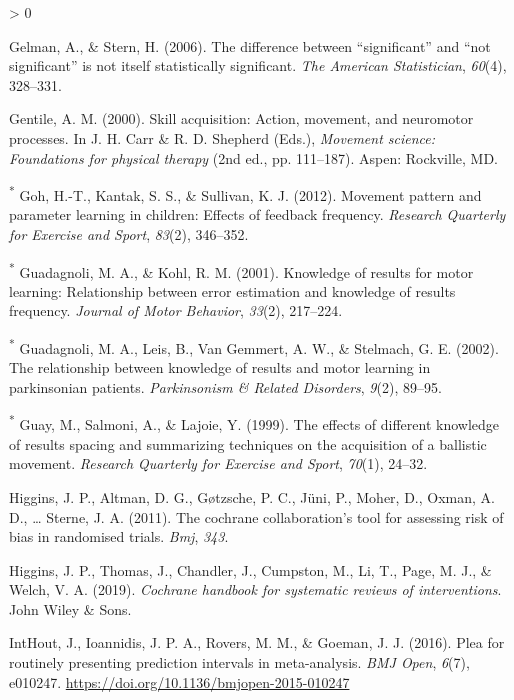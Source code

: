 \documentclass[
  english,
  man, donotrepeattitle,floatsintext]{apa7}
\newlength{\cslhangindent}
\newenvironment{CSLReferences}[2] %
 {%
  \setlength{\parindent}{0pt}
  \ifodd #1 \everypar{\setlength{\hangindent}{\cslhangindent}}\ignorespaces\fi
  \ifnum #2 > 0
  \setlength{\parskip}{#2\baselineskip}
  \fi
 }%
 {}
\begin{document}
\begin{CSLReferences}{1}{0}
\leavevmode\hypertarget{ref-Gelman2006}{}%
Gelman, A., \& Stern, H. (2006). The difference between {``significant''} and {``not significant''} is not itself statistically significant. \emph{The American Statistician}, \emph{60}(4), 328--331.

\leavevmode\hypertarget{ref-Gentile2000}{}%
Gentile, A. M. (2000). Skill acquisition: Action, movement, and neuromotor processes. In J. H. Carr \& R. D. Shepherd (Eds.), \emph{Movement science: Foundations for physical therapy} (2nd ed., pp. 111--187). Aspen: Rockville, MD.

\leavevmode\hypertarget{ref-Goh2012}{}%
\textsuperscript{*} Goh, H.-T., Kantak, S. S., \& Sullivan, K. J. (2012). Movement pattern and parameter learning in children: Effects of feedback frequency. \emph{Research Quarterly for Exercise and Sport}, \emph{83}(2), 346--352.

\leavevmode\hypertarget{ref-Guadagnoli2001}{}%
\textsuperscript{*} Guadagnoli, M. A., \& Kohl, R. M. (2001). Knowledge of results for motor learning: Relationship between error estimation and knowledge of results frequency. \emph{Journal of Motor Behavior}, \emph{33}(2), 217--224.

\leavevmode\hypertarget{ref-Guadagnoli2002}{}%
\textsuperscript{*} Guadagnoli, M. A., Leis, B., Van Gemmert, A. W., \& Stelmach, G. E. (2002). The relationship between knowledge of results and motor learning in parkinsonian patients. \emph{Parkinsonism \& Related Disorders}, \emph{9}(2), 89--95.

\leavevmode\hypertarget{ref-Guay1999}{}%
\textsuperscript{*} Guay, M., Salmoni, A., \& Lajoie, Y. (1999). The effects of different knowledge of results spacing and summarizing techniques on the acquisition of a ballistic movement. \emph{Research Quarterly for Exercise and Sport}, \emph{70}(1), 24--32.

\leavevmode\hypertarget{ref-Higgins2011}{}%
Higgins, J. P., Altman, D. G., Gøtzsche, P. C., Jüni, P., Moher, D., Oxman, A. D., \ldots{} Sterne, J. A. (2011). The cochrane collaboration's tool for assessing risk of bias in randomised trials. \emph{Bmj}, \emph{343}.

\leavevmode\hypertarget{ref-Higgins2019}{}%
Higgins, J. P., Thomas, J., Chandler, J., Cumpston, M., Li, T., Page, M. J., \& Welch, V. A. (2019). \emph{Cochrane handbook for systematic reviews of interventions}. John Wiley \& Sons.

\leavevmode\hypertarget{ref-IntHout2016}{}%
IntHout, J., Ioannidis, J. P. A., Rovers, M. M., \& Goeman, J. J. (2016). Plea for routinely presenting prediction intervals in meta-analysis. \emph{BMJ Open}, \emph{6}(7), e010247. \url{https://doi.org/10.1136/bmjopen-2015-010247}


\end{CSLReferences}
\end{document}
